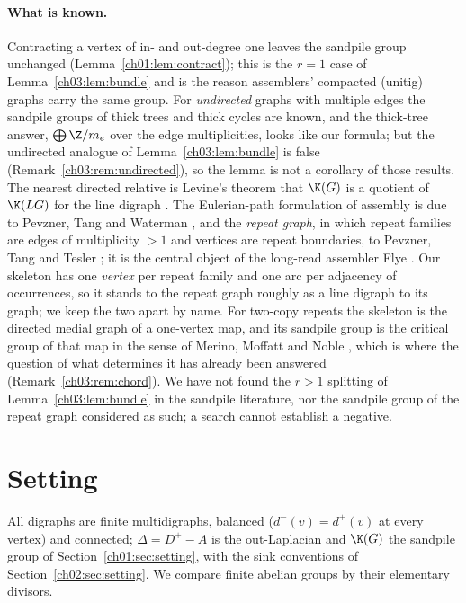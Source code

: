\paragraph{What is known.} Contracting a vertex of in- and out-degree one leaves the
sandpile group unchanged (Lemma~\ref{ch01:lem:contract}); this is the $r=1$ case of
Lemma~\ref{ch03:lem:bundle} and is the reason assemblers' compacted (unitig) graphs
\cite{BCALM,KM} carry the same group. For \emph{undirected} graphs with multiple edges
the sandpile groups of thick trees \cite{ChenSchedler} and thick cycles \cite{Alar} are
known, and the thick-tree answer, $\bigoplus\Z/m_e$ over the edge multiplicities, looks
like our formula; but the undirected analogue of Lemma~\ref{ch03:lem:bundle} is false
(Remark~\ref{ch03:rem:undirected}), so the lemma is not a corollary of those results. The
nearest directed relative is Levine's theorem that $\K(G)$ is a quotient of $\K(LG)$ for
the line digraph \cite{Levine,PSX}. The Eulerian-path formulation of assembly is due to
Pevzner, Tang and Waterman \cite{PTW}, and the \emph{repeat graph}, in which repeat
families are edges of multiplicity $>1$ and vertices are repeat boundaries, to Pevzner,
Tang and Tesler \cite{PTT}; it is the central object of the long-read assembler Flye
\cite{Flye}. Our skeleton has one \emph{vertex} per repeat family and one arc per
adjacency of occurrences, so it stands to the repeat graph roughly as a line digraph to
its graph; we keep the two apart by name. For two-copy repeats the skeleton is the
directed medial graph of a one-vertex map, and its sandpile group is the critical group
of that map in the sense of Merino, Moffatt and Noble \cite{MMN}, which is where the
question of what determines it has already been answered (Remark~\ref{ch03:rem:chord}). We
have not found the $r>1$ splitting of Lemma~\ref{ch03:lem:bundle} in the sandpile literature,
nor the sandpile group of the repeat graph considered as such; a search cannot establish
a negative.

\section{Setting}\label{ch03:sec:setting}

All digraphs are finite multidigraphs, balanced ($d^-(v)=d^+(v)$ at every vertex) and
connected; $\Delta=D^+-A$ is the out-Laplacian and $\K(G)$ the sandpile group of
Section~\ref{ch01:sec:setting}, with the sink conventions of Section~\ref{ch02:sec:setting}. We
compare finite abelian groups by their elementary divisors.

